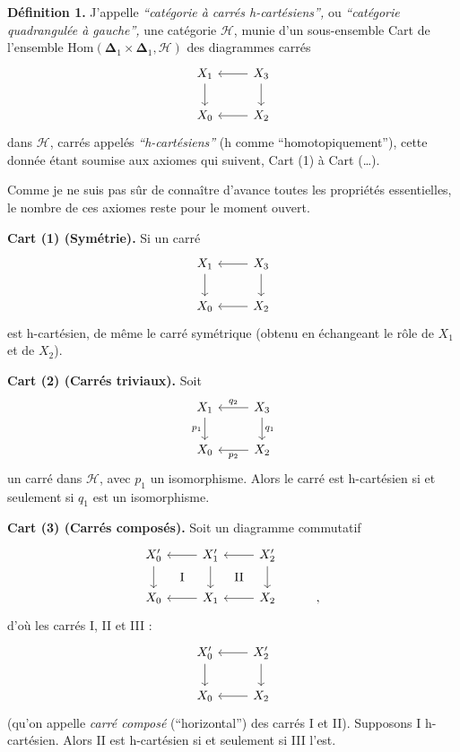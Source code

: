 \documentclass[11pt]{article}
\newcommand{\printedpage}[1]{\if\relax\detokenize{#1}\relax\else\begingroup\reversemarginpar\marginnote{\footnotesize p.~#1}\endgroup\fi}
\newcommand{\msp}[1]{\marginnote{\footnotesize [#1]}}
\begin{document}
\noindent\textbf{Définition 1.} J'appelle \textit{“catégorie à carrés h-cartésiens”,} ou \textit{“catégorie quadrangulée à gauche”,} une catégorie $\mathcal{H}$, munie d'un sous-ensemble Cart de l'ensemble $\mathrm{Hom}(\boldsymbol{\Delta}_1\times\boldsymbol{\Delta}_1,\mathcal{H})$
\printedpage{2}
des diagrammes carrés
\[
\begin{tikzcd}
X_1 \arrow[d] & X_3 \arrow[l] \arrow[d] \\
X_0 & X_2 \arrow[l]
\end{tikzcd}
\]
dans $\mathcal{H}$, carrés appelés \textit{“h-cartésiens”} (h comme “homotopiquement”), cette \msp{page 3} donnée étant soumise aux axiomes qui suivent, Cart (1) à Cart (\ldots).

\noindent Comme je ne suis pas sûr de connaître d'avance toutes les propriétés essentielles, le nombre de ces axiomes reste pour le moment ouvert.

\noindent\textbf{Cart (1) (Symétrie).} Si un carré
\[
\begin{tikzcd}
X_1 \arrow[d] & X_3 \arrow[l] \arrow[d] \\
X_0 & X_2 \arrow[l]
\end{tikzcd}
\]
est h-cartésien, de même le carré symétrique (obtenu en échangeant le rôle de $X_1$ et de $X_2$).

\noindent\textbf{Cart (2) (Carrés triviaux).} Soit
\[
\begin{tikzcd}
X_1 \arrow[d, "p_1"'] & X_3 \arrow[l, "q_2"'] \arrow[d, "q_1"] \\
X_0 & X_2 \arrow[l, "p_2"]
\end{tikzcd}
\]
un carré dans $\mathcal{H}$, avec $p_1$ un isomorphisme. Alors le carré est h-cartésien si et seulement si $q_1$ est un isomorphisme.

\noindent\textbf{Cart (3) (Carrés composés).} Soit un diagramme commutatif
\[
\begin{tikzcd}
X'_0 \arrow[d] \arrow[dr, phantom, "\mathrm{I}"] & X'_1 \arrow[l] \arrow[d] \arrow[dr, phantom, "\mathrm{II}"] & X'_2 \arrow[l] \arrow[d] & \\
X_0 & X_1 \arrow[l] & X_2 \arrow[l] & ,
\end{tikzcd}
\]
d'où les carrés I, II et III :
\[
\begin{tikzcd}
X'_0 \arrow[d] & X'_2 \arrow[l] \arrow[d] \\
X_0 & X_2 \arrow[l]
\end{tikzcd}
\]
\printedpage{3}
(qu'on appelle \textit{carré composé} (“horizontal”) des carrés I et II). Supposons I h-cartésien. Alors II est h-cartésien si et seulement si III l'est.
\end{document}
